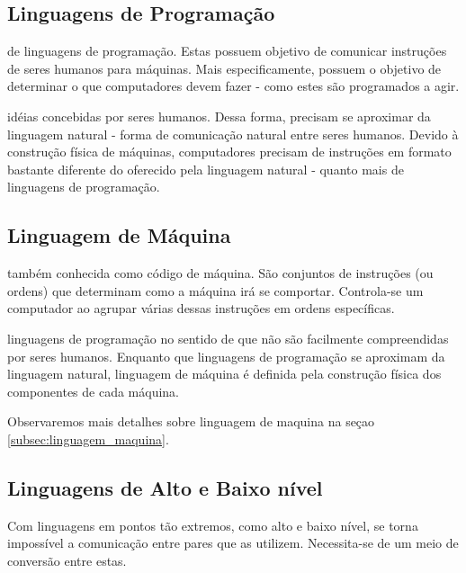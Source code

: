 \subsection{Linguagens de Programação}

de linguagens de programação. Estas possuem objetivo de comunicar instruções de
seres humanos para máquinas. Mais especificamente, possuem o objetivo de
determinar o que computadores devem fazer - como estes são programados a agir.

idéias concebidas por seres humanos. Dessa forma, precisam se aproximar da
linguagem natural - forma de comunicação natural entre seres humanos.  Devido à
construção física de máquinas, computadores precisam de instruções em formato
bastante diferente do oferecido pela linguagem natural - quanto mais de
linguagens de programação.

\subsection{Linguagem de Máquina}

também conhecida como código de máquina. São conjuntos de instruções (ou ordens)
que determinam como a máquina irá se comportar. Controla-se um computador ao
agrupar várias dessas instruções em ordens específicas.

linguagens de programação no sentido de que não são facilmente compreendidas por
seres humanos. Enquanto que linguagens de programação se aproximam da linguagem
natural, linguagem de máquina é definida pela construção física dos componentes
de cada máquina.

Observaremos mais detalhes sobre linguagem de maquina na seçao
\ref{subsec:linguagem_maquina}.

\subsection{Linguagens de Alto e Baixo nível}


Com linguagens em pontos tão extremos, como alto e baixo nível, se torna
impossível a comunicação entre pares que as utilizem. Necessita-se de um meio de
conversão entre estas.

